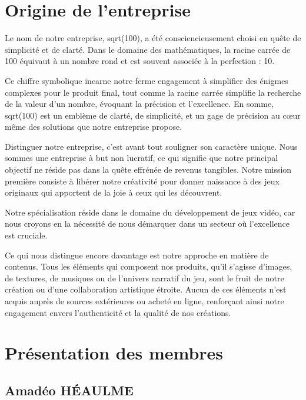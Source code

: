 \documentclass{report}
\begin{document}
\section{Origine de l'entreprise}

Le nom de notre entreprise, sqrt(100), a été consciencieusement choisi en quête
de simplicité et de clarté. Dans le domaine des mathématiques, la racine carrée de 100 équivaut à un nombre rond et est souvent associée à la perfection : 10. \newline

 Ce chiffre symbolique incarne notre ferme engagement à simplifier des énigmes complexes pour le produit final, tout comme la racine carrée simplifie la recherche de la valeur d’un nombre, évoquant la précision et l’excellence. En somme, sqrt(100) est un emblème de clarté, de simplicité, et un gage de précision au cœur même des solutions que notre entreprise propose. \newline

Distinguer notre entreprise, c’est avant tout souligner son caractère unique. Nous sommes une entreprise à but non lucratif, ce qui signifie que notre principal objectif ne réside pas dans la quête effrénée de revenus tangibles. Notre mission première consiste à libérer notre créativité pour donner naissance à des jeux originaux qui apportent de la joie à ceux qui les découvrent. \newline

 Notre spécialisation réside dans le domaine du développement de jeux vidéo, car nous croyons en la nécessité de nous démarquer dans un secteur où l’excellence est cruciale. \newline

Ce qui nous distingue encore davantage est notre approche en matière de contenus. Tous les éléments qui composent nos produits, qu’il s’agisse d’images, de textures, de musiques ou de l’univers narratif du jeu, sont le fruit de notre création ou d’une collaboration artistique étroite. Aucun de ces éléments n’est acquis auprès de sources extérieures ou acheté en ligne, renforçant ainsi notre engagement envers l’authenticité et la qualité de nos créations.


\section{Présentation des membres}

	\subsection{\normalsize Amadéo HÉAULME}
	
\end{document}
